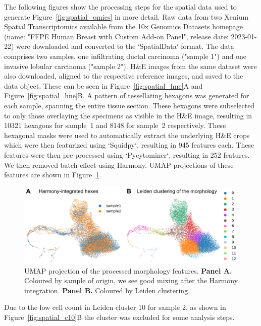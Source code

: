 \documentclass{article}
\begin{document}
The following figures show the processing steps for the spatial data used to generate Figure~\ref{fig:spatial_omics} in more detail. Raw data from two Xenium Spatial Transcriptomics available from the 10x Genomics Datasets homepage (name: "FFPE Human Breast with Custom Add-on Panel", release date: 2023-01-22) were downloaded and converted to the `SpatialData` format. The data comprises two samples, one infiltrating ductal carcinoma ("sample 1") and one invasive lobular carcinoma ("sample 2"). H\&E images from the same dataset were also downloaded, aligned to the respective reference images, and saved to the data object. These can be seen in Figure~\ref{fig:spatial_hne}A and Figure~\ref{fig:spatial_hne}B. A pattern of tessellating hexagons was generated for each sample, spanning the entire tissue section. These hexagons were subselected to only those overlaying the specimens as visible in the H\&E image, resulting in 10321 hexagons for sample~1 and 8148 for sample~2 respectively. These hexagonal masks were used to automatically extract the underlying H\&E crops which were then featurized using `Squidpy`, resulting in 945 features each. These features were then pre-processed using `Pycytominer`, resulting in 252 features. We then removed batch effect using Harmony. UMAP projections of these features are shown in Figure~\ref{fig:spatial_umap}.

\begin{figure}[htbp]
\centering
\includegraphics[width=.8\linewidth]{./figs/fig_S1_spatial_umap.png}
\caption{\label{fig:spatial_umap}{}UMAP projection of the processed morphology features. \textbf{Panel A.} Coloured by sample of origin, we see good mixing after the Harmony integration. \textbf{Panel B.} Coloured by Leiden clustering.}
\end{figure}

Due to the low cell count in Leiden cluster 10 for sample 2, as shown in Figure~\ref{fig:spatial_c10}B the cluster was excluded for some analysis steps.
\end{document}
